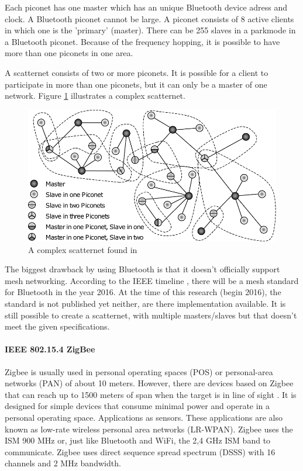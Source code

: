 \documentclass[10pt,a4paper]{article}
\begin{document}
Each piconet has one master which has an unique Bluetooth device adress and clock. A Bluetooth piconet cannot be large. A piconet consists of 8 active clients in which one is the 'primary' (master).\cite{tcipbook} There can be 255 slaves in a parkmode in a Bluetooth piconet. Because of the frequency hopping, it is possible to have more than one piconets in one area. 

A scatternet consists of two or more piconets. It is possible for a client to participate in more than one piconets, but it can only be a master of one network. Figure \ref{fig:scatternet} illustrates a complex scatternet.

\begin{figure}[H]
   \centering
   \includegraphics[width=1\textwidth]{scatternet}
   \caption{A complex scatternet found in \cite{Bluetoothwifisurveyandcomparison}}
   \label{fig:scatternet}
\end{figure}

The biggest drawback by using Bluetooth is that it doesn't officially support mesh networking. According to the IEEE timeline \cite{IEEE80211timeline}, there will be a mesh standard for Bluetooth in the year 2016. \cite{Bluetoothmesh} At the time of this research (begin 2016), the standard is not published yet neither, are there implementation available. It is still possible to create a scatternet, with multiple masters/slaves but that doesn't meet the given specifications. \\

\paragraph{IEEE 802.15.4 ZigBee}
Zigbee is usually used in personal operating spaces (POS) or personal-area networks (PAN) of about 10 meters. \cite{combook} However, there are devices based on Zigbee that can reach up to 1500 meters of span when the target is in line of sight \cite{zigbeewiki}. It is designed for simple devices that consume minimal power and operate in a personal operating space. Applications as sensors. These applications are also known as low-rate wireless personal area networks (LR-WPAN). \cite{comparitivestudywirelessprotocols} Zigbee uses the ISM 900 MHz or, just like Bluetooth and WiFi, the 2,4 GHz ISM band to communicate. Zigbee uses direct sequence spread spectrum (DSSS) with 16 channels and 2 MHz bandwidth.
\end{document}
